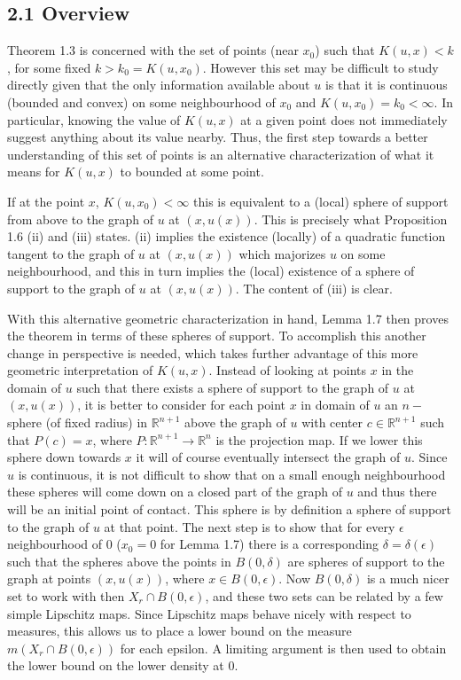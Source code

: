 \documentclass[10pt]{article}
\begin{document}
\subsection{2.1 Overview}
Theorem 1.3 is concerned with the set of points (near $x_0$) such that $K(u,x)<k$, for some fixed $k>k_0= K(u,x_0)$. However this set may be difficult to study directly given that the only information available about $u$ is that it is continuous (bounded and convex) on some neighbourhood of $x_0$ and $K(u,x_0)=k_0<\infty$. In particular, knowing the value of $K(u,x)$ at a given point does not immediately suggest anything about its value nearby.
Thus, the first step towards a better understanding of this set of points is an alternative characterization of what it means for $K(u,x)$ to bounded at some point.

If at the point $x$, $K(u,x_0)<\infty$ this is equivalent to a (local) sphere of support from above to the graph of $u$ at $(x,u(x))$. This is precisely what Proposition 1.6 (ii) and (iii) states. (ii) implies the existence (locally) of a quadratic function tangent to the graph of $u$ at $(x,u(x))$ which majorizes $u$ on some neighbourhood, and this in turn implies the (local) existence of a sphere of support to the graph of $u$ at $(x,u(x))$. The content of (iii) is clear.

With this alternative geometric characterization in hand, Lemma 1.7 then proves the theorem in terms of these spheres of support. To accomplish this another change in perspective is needed, which takes further advantage of this more geometric interpretation of $K(u,x)$. Instead of looking at points $x$ in the domain of $u$ such that there exists a sphere of support to the graph of $u$ at $(x,u(x))$, it is better to consider for each point $x$ in domain of $u$ an $n-$sphere (of fixed radius) in $\mathbb{R}^{n+1}$ above the graph of $u$ with center $c\in \mathbb{R}^{n+1}$ such that $P(c)=x$, where $P:\mathbb{R}^{n+1}\rightarrow \mathbb{R}^{n}$ is the projection map. If we lower this sphere down towards $x$ it will of course eventually intersect the graph of $u$. Since $u$ is continuous, it is not difficult to show that on a small enough neighbourhood these spheres will come down on a closed part of the graph of $u$ and thus there will be an initial point of contact. This sphere is by definition a sphere of support to the graph of $u$ at that point. The next step is to show that for every $\epsilon$ neighbourhood of 0 ($x_0=0$ for Lemma 1.7) there is a corresponding $\delta=\delta(\epsilon)$ such that the spheres above the points in $B(0,\delta)$ are spheres of support to the graph at points $(x,u(x))$, where $x\in B(0,\epsilon)$. Now $B(0,\delta)$ is a much nicer set to work with then $X_r\cap B(0,\epsilon)$, and these two sets can be related by a few simple Lipschitz maps. Since Lipschitz maps behave nicely with respect to measures, this allows us to place a lower bound on the measure $m(X_r\cap B(0,\epsilon))$ for each epsilon. A limiting argument is then used to obtain the lower bound on the lower density at 0.
\end{document}
